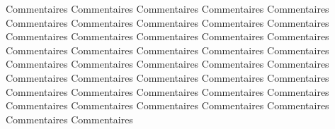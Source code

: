 	Commentaires Commentaires Commentaires Commentaires Commentaires Commentaires Commentaires Commentaires Commentaires Commentaires Commentaires Commentaires Commentaires Commentaires Commentaires Commentaires Commentaires Commentaires Commentaires Commentaires Commentaires Commentaires Commentaires Commentaires Commentaires Commentaires Commentaires Commentaires Commentaires Commentaires Commentaires Commentaires Commentaires Commentaires Commentaires Commentaires Commentaires Commentaires Commentaires Commentaires Commentaires Commentaires 
	\clearpage

